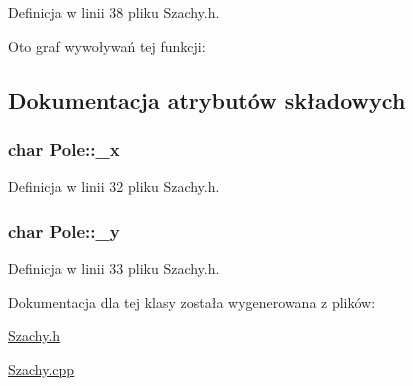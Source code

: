 \-Definicja w linii 38 pliku \-Szachy.\-h.



\-Oto graf wywoływań tej funkcji\-:




\subsection{\-Dokumentacja atrybutów składowych}
\hypertarget{class_pole_a8168ef8eec0fd6831357811fc80cd0ac}{
\subsubsection[{\-\_\-x}]{\setlength{\rightskip}{0pt plus 5cm}char {\bf \-Pole\-::\-\_\-x}}}\label{class_pole_a8168ef8eec0fd6831357811fc80cd0ac}


\-Definicja w linii 32 pliku \-Szachy.\-h.

\hypertarget{class_pole_a00c285b4bf7f491a839d2aed6b0700c7}{
\subsubsection[{\-\_\-y}]{\setlength{\rightskip}{0pt plus 5cm}char {\bf \-Pole\-::\-\_\-y}}}\label{class_pole_a00c285b4bf7f491a839d2aed6b0700c7}


\-Definicja w linii 33 pliku \-Szachy.\-h.



\-Dokumentacja dla tej klasy została wygenerowana z plików\-:\begin{DoxyCompactItemize}
\item 
\hyperlink{_szachy_8h}{\-Szachy.\-h}\item 
\hyperlink{_szachy_8cpp}{\-Szachy.\-cpp}\end{DoxyCompactItemize}
